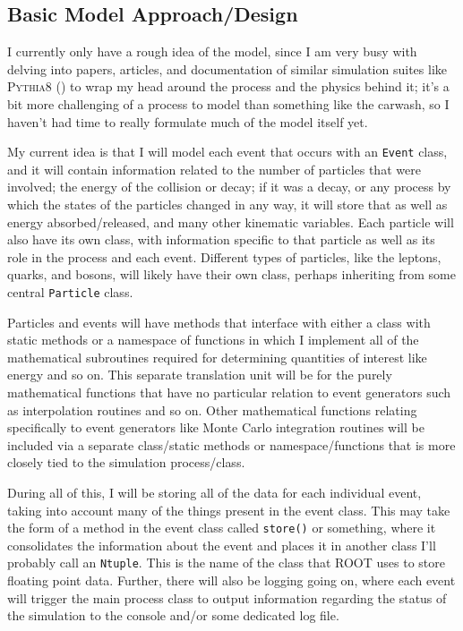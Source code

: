 \subsection{Basic Model Approach/Design}

I currently only have a rough idea of the model, since I am very busy with delving into papers, articles, and documentation of similar simulation suites like \textsc{Pythia8} (\cite{PYTHIA8DOC}) to wrap my head around the process and the physics behind it; it's a bit more challenging of a process to model than something like the carwash, so I haven't had time to really formulate much of the model itself yet.

My current idea is that I will model each event that occurs with an \texttt{Event} class, and it will contain information related to the number of particles that were involved; the energy of the collision or decay; if it was a decay, or any process by which the states of the particles changed in any way, it will store that as well as energy absorbed/released, and many other kinematic variables. Each particle will also have its own class, with information specific to that particle as well as its role in the process and each event. Different types of particles, like the leptons, quarks, and bosons, will likely have their own class, perhaps inheriting from some central \texttt{Particle} class.

Particles and events will have methods that interface with either a class with static methods or a namespace of functions in which I implement all of the mathematical subroutines required for determining quantities of interest like energy and so on. This separate translation unit will be for the purely mathematical functions that have no particular relation to event generators such as interpolation routines and so on. Other mathematical functions relating specifically to event generators like Monte Carlo integration routines will be included via a separate class/static methods or namespace/functions that is more closely tied to the simulation process/class.

During all of this, I will be storing all of the data for each individual event, taking into account many of the things present in the event class. This may take the form of a method in the event class called \texttt{store()} or something, where it consolidates the information about the event and places it in another class I'll probably call an \texttt{Ntuple}. This is the name of the class that ROOT uses to store floating point data. Further, there will also be logging going on, where each event will trigger the main process class to output information regarding the status of the simulation to the console and/or some dedicated log file.

